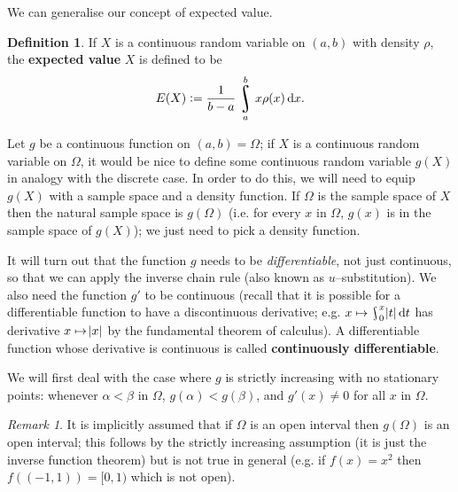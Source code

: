 \documentclass[a4paper,leqno]{article}
\DeclareMathOperator*{\rint}{\scalerel*{\rotatebox{17}{$\!\int\!$}}{\int}}
\numberwithin{equation}{section}
\theoremstyle{definition}
\newtheorem{defn}[equation]{Definition}
\theoremstyle{remark}
\newtheorem{rem}[equation]{Remark}
\newcommand{\df}{\textbf}
\begin{document}
We can generalise our concept of expected value.
\begin{defn}
  If $ X $ is a continuous random variable on $ (a,b) $ with density $ \rho $, the \df{expected value} $ X $ is defined to be
  \begin{displaymath}
    E(X) := \frac{1}{b - a} \rint_a^b x\rho(x) \dif{x}.
  \end{displaymath}
\end{defn}

Let $ g $ be a continuous function on $ (a,b) = \Omega $; if $ X $ is a continuous random variable on $ \Omega $, it would be nice to
define some continuous random variable $ g(X) $ in analogy with the discrete case. In order to do this, we will need to equip $ g(X) $ with a sample space
and a density function. If $ \Omega $ is the sample space of $ X $ then the natural sample space is $ g(\Omega) $ (i.e. for every $ x $
in $ \Omega $, $ g(x) $ is in the sample space of $ g(X) $); we just need to pick a density function.

It will turn out that the function $ g $ needs to be \emph{differentiable}, not just continuous, so that we can apply the inverse
chain rule (also known as $u$--substitution). We also need the function $ g' $ to be continuous (recall that it is possible for
a differentiable function to have a discontinuous derivative; e.g. $ x \mapsto \rint_0^x \abs{t} \dif{t} $ has derivative $ x\mapsto\abs{x} $
by the fundamental theorem of calculus). A differentiable function whose derivative is continuous is called \df{continuously differentiable}.

We will first deal with the case where $ g $ is strictly increasing with no stationary points: whenever $ \alpha < \beta $ in $ \Omega $, $ g(\alpha) < g(\beta) $,
and $ g'(x) \neq 0 $ for all $ x $ in $ \Omega $.

\begin{rem}\label{rem:openmappingthm}
  It is implicitly assumed that if $ \Omega $ is an open interval then $ g(\Omega) $ is an open interval; this follows by the strictly increasing
  assumption (it is just the inverse function theorem) but is not true in general (e.g. if $ f(x) = x^2 $ then $ f((-1,1)) = [0,1) $ which is not open).
\end{rem}
\end{document}
